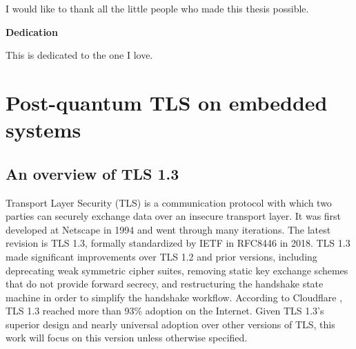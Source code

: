 \documentclass[letterpaper,12pt,titlepage,oneside,final]{book}
\let\origdoublepage\cleardoublepage
\newcommand{\clearemptydoublepage}{%
  \clearpage{\pagestyle{empty}\origdoublepage}}
\let\cleardoublepage\clearemptydoublepage
\begin{document}
I would like to thank all the little people who made this thesis possible.
\cleardoublepage
{}    %

\begin{center}\textbf{Dedication}\end{center}

This is dedicated to the one I love.
\cleardoublepage
{}    %

\renewcommand\contentsname{Table of Contents}
\tableofcontents
\cleardoublepage
{}    %

\listoffigures
\cleardoublepage
{}		%

\listoftables
\cleardoublepage
{}		%

\renewcommand*{\abbreviationsname}{List of Abbreviations}
\printglossary[type=abbreviations]
\cleardoublepage
{}		%

\printglossary[type=symbols]
\cleardoublepage
{}		%



\chapter{Post-quantum TLS on embedded systems}
\section{An overview of TLS 1.3}
Transport Layer Security (TLS) is a communication protocol with which two parties can securely exchange data over an insecure transport layer.
It was first developed at Netscape in 1994 and went through many iterations.
The latest revision is TLS 1.3, formally standardized by IETF in RFC8446 \cite{DBLP:journals/rfc/rfc8446} in 2018.
TLS 1.3 made significant improvements over TLS 1.2 \cite{DBLP:journals/rfc/rfc5246} and prior versions, including deprecating weak symmetric cipher suites, removing static key exchange schemes that do not provide forward secrecy, and restructuring the handshake state machine in order to simplify the handshake workflow.
According to Cloudflare \cite{Westerbaan_2024}, TLS 1.3 reached more than 93\% adoption on the Internet.
Given TLS 1.3's superior design and nearly universal adoption over other versions of TLS, this work will focus on this version unless otherwise specified.
\end{document}
